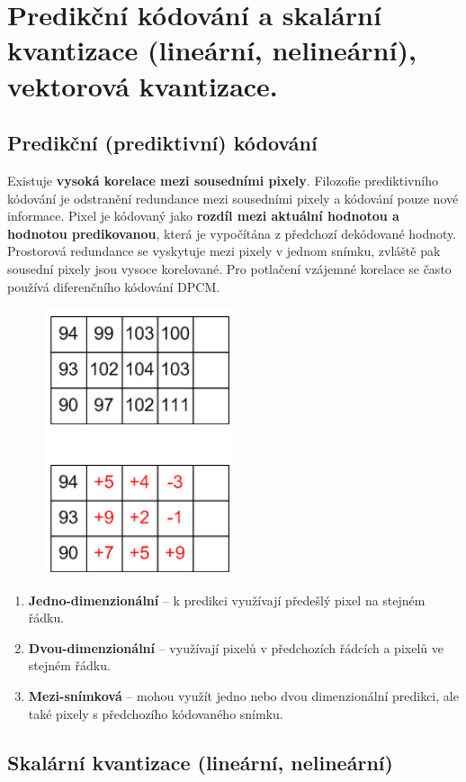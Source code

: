 \section{Predikční kódování a skalární kvantizace (lineární, nelineární), vektorová kvantizace.}


\subsection{Predikční (prediktivní) kódování}

Existuje \textbf{vysoká korelace mezi sousedními pixely}. Filozofie prediktivního kódování je odstranění redundance mezi sousedními pixely a kódování pouze nové informace. Pixel je kódovaný jako \textbf{rozdíl mezi aktuální hodnotou a hodnotou predikovanou}, která je vypočítána z předchozí dekódované hodnoty. Prostorová redundance se vyskytuje mezi pixely v jednom snímku, zvláště pak sousední pixely jsou vysoce korelované. Pro potlačení vzájemné korelace se často používá diferenčního kódování DPCM.

\begin{figure}[ht]   
    \centering
    \includegraphics[width=0.22\linewidth]{images/image.png} 
\end{figure}

\begin{enumerate}
    \item \textbf{Jedno-dimenzionální} -- k predikci využívají předešlý pixel na stejném řádku.
    \item \textbf{Dvou-dimenzionální} -- využívají pixelů v předchozích řádcích a pixelů ve stejném řádku.
    \item \textbf{Mezi-snímková} -- mohou využít jedno nebo dvou dimenzionální predikci, ale také pixely s předchozího kódovaného snímku.
\end{enumerate}

\subsection{Skalární kvantizace (lineární, nelineární)}

